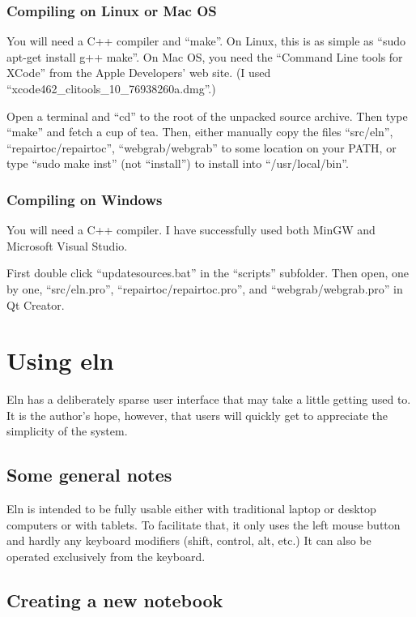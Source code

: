 \documentclass[11pt]{report}
\begin{document}
\subsection{Compiling on Linux or Mac OS}

You will need a C++ compiler and ``make''. On Linux, this is as simple
as ``sudo apt-get install g++ make''. On Mac OS, you need the
``Command Line tools for XCode'' from the Apple Developers' web
site. (I used ``xcode462\_clitools\_10\_76938260a.dmg''.)

Open a terminal and ``cd'' to the root of the unpacked source
archive. Then type ``make'' and fetch a cup of tea. Then, either
manually copy the files ``src/eln'', ``repairtoc/repairtoc'',
``webgrab/webgrab'' to some location on your PATH, or type ``sudo make
inst'' (not ``install'') to install into ``/usr/local/bin''.

\subsection{Compiling on Windows}
You will need a C++ compiler. I have successfully used both MinGW and
Microsoft Visual Studio.

First double click ``updatesources.bat'' in the
``scripts'' subfolder. Then open, one by one, ``src/eln.pro'',
``repairtoc/repairtoc.pro'', and ``webgrab/webgrab.pro'' in Qt
Creator.  

\chapter{Using eln}

Eln has a deliberately sparse user interface that may take a little
getting used to. It is the author's hope, however, that users will
quickly get to appreciate the simplicity of the system.

\section{Some general notes}

Eln is intended to be fully usable either with traditional laptop or
desktop computers or with tablets. To facilitate that, it only uses
the left mouse button and hardly any keyboard modifiers (shift,
control, alt, etc.) It can also be operated exclusively from the
keyboard.

\section{Creating a new notebook}
\end{document}
